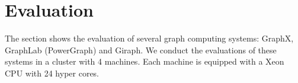 \section{Evaluation}
The section shows the evaluation of several graph computing systems:
GraphX, GraphLab (PowerGraph) and Giraph.
We conduct the evaluations of these systems in a cluster with 4 machines.
Each machine is equipped with a Xeon CPU with 24 hyper cores.
